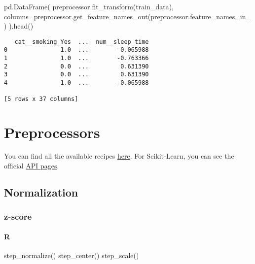 \documentclass[
  letterpaper,
  DIV=11,
  numbers=noendperiod]{scrreprt}
\newenvironment{Shaded}{\begin{snugshade}}{\end{snugshade}}
\newcommand{\FunctionTok}[1]{\textcolor[rgb]{0.28,0.35,0.67}{#1}}
\newcommand{\NormalTok}[1]{\textcolor[rgb]{0.00,0.46,0.62}{#1}}
\newcommand{\OperatorTok}[1]{\textcolor[rgb]{0.37,0.37,0.37}{#1}}
\let\oldparagraph\paragraph
\renewcommand{\paragraph}[1]{\oldparagraph{#1}\mbox{}}
\begin{document}
\begin{Shaded}
\begin{Highlighting}[]
\NormalTok{pd.DataFrame(}
\NormalTok{    preprocessor.fit\_transform(train\_data),}
\NormalTok{    columns}\OperatorTok{=}\NormalTok{preprocessor.get\_feature\_names\_out(preprocessor.feature\_names\_in\_)}
\NormalTok{).head()}
\end{Highlighting}
\end{Shaded}

\begin{verbatim}
   cat__smoking_Yes  ...  num__sleep_time
0               1.0  ...        -0.065988
1               1.0  ...        -0.763366
2               0.0  ...         0.631390
3               0.0  ...         0.631390
4               1.0  ...        -0.065988

[5 rows x 37 columns]
\end{verbatim}

\hypertarget{preprocessors}{%
\section{Preprocessors}\label{preprocessors}}

You can find all the available recipes
\href{https://www.tidymodels.org/find/recipes/}{here}. For Scikit-Learn,
you can see the official
\href{https://scikit-learn.org/stable/modules/classes.html}{API pages}.

\hypertarget{normalization}{%
\subsection{Normalization}\label{normalization}}

\hypertarget{z-score}{%
\subsubsection{z-score}\label{z-score}}

\hypertarget{r-62}{%
\paragraph{R}\label{r-62}}

\begin{Shaded}
\begin{Highlighting}[]
\FunctionTok{step\_normalize}\NormalTok{()}
\FunctionTok{step\_center}\NormalTok{()}
\FunctionTok{step\_scale}\NormalTok{()}
\end{Highlighting}
\end{Shaded}
\end{document}
